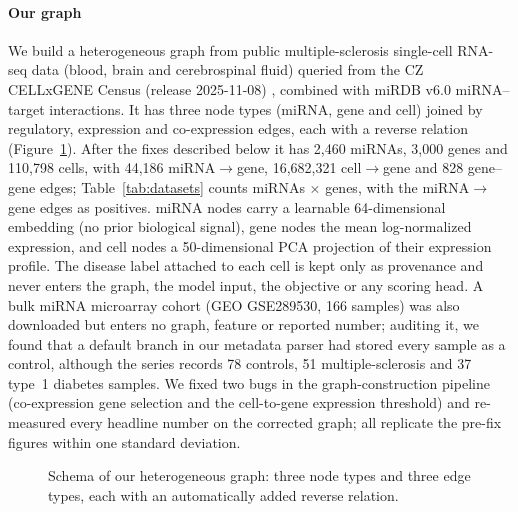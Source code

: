 \documentclass[review]{elsarticle}
\begin{document}
\paragraph{Our graph} We build a heterogeneous graph from public multiple-sclerosis
single-cell RNA-seq data (blood, brain and cerebrospinal fluid) queried from the CZ
CELLxGENE Census (release 2025-11-08) \cite{czi2025cellxgene}, combined with miRDB v6.0
\cite{chen2020mirdb} miRNA--target interactions. It has three node types (miRNA, gene
and cell) joined by regulatory, expression and co-expression edges, each with a reverse
relation (Figure~\ref{fig:graph_schema}). After the fixes described below it has 2,460
miRNAs, 3,000 genes and 110,798 cells, with 44,186 miRNA$\to$gene, 16,682,321
cell$\to$gene and 828 gene--gene edges; Table~\ref{tab:datasets} counts miRNAs $\times$
genes, with the miRNA$\to$gene edges as positives. miRNA nodes carry a learnable
64-dimensional embedding (no prior biological signal), gene nodes the mean log-normalized
expression, and cell nodes a 50-dimensional PCA projection of their expression profile. The disease label attached to each cell is kept
only as provenance and never enters the graph, the model input, the objective or any
scoring head. A bulk miRNA microarray cohort (GEO GSE289530, 166 samples) was also downloaded
but enters no graph, feature or reported number; auditing it, we found that a default branch in
our metadata parser had stored every sample as a control, although the series records 78
controls, 51 multiple-sclerosis and 37 type~1 diabetes samples. We fixed two bugs in the graph-construction pipeline (co-expression gene
selection and the cell-to-gene expression threshold) and re-measured every headline number
on the corrected graph; all replicate the pre-fix figures within one standard deviation.

\begin{figure}[h!]
\centering
{}
\caption{Schema of our heterogeneous graph: three node types and three edge types, each with an automatically added reverse relation.}
\label{fig:graph_schema}
\end{figure}
\end{document}
